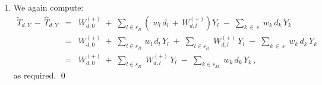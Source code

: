 \begin{enumerate}
\begin{eqnarray*}
            \underset{k \in s_{M}^{(j)}}{\sum}\;
            w_{k}\,d_{k}\,\varphi^{(j)}_{0k}
            \,\right)
        \,+\,
        \left(\;
            \underset{l \in s_{R}}{\sum}\;w_{l}\,d_{l}\,Y_{l}
            \,+\,
            \underset{l \in s_{R}}{\sum}\!\left(\;
                \overset{J}{\underset{j=1}{\sum}}\;
                \underset{k \in s_{M}^{(j)}}{\sum}\,w_{k}\,d_{k}\,\varphi^{(j)}_{lk}
                \right)
            Y_{l}
            \right)
    \\
    & = &
        \left(\;
            \overset{J}{\underset{j=1}{\sum}}\;
            \underset{k \in s_{M}^{(j)}}{\sum}\;
            w_{k}\,d_{k}\,\varphi^{(j)}_{0k}
            \,\right)
        \,+\,
        \underset{l \in s_{R}}{\sum}
        \left(\;
            w_{l}\,d_{l}
            \,+\,
            \left(\;
                \overset{J}{\underset{j=1}{\sum}}\;
                \underset{k \in s_{M}^{(j)}}{\sum}\,w_{k}\,d_{k}\,\varphi^{(j)}_{lk}
                \right)
            \right)
        Y_{l}
    \\
    & \overset{{\color{white}\textnormal{\LARGE$1$}}}{=} &
        W^{(+)}_{d,0}
        \;+\;
        \underset{l \in s_{R}}{\sum}\left(\,w_{l}d_{l} \,+\, W^{(+)}_{d,l}\,\right)Y_{l}
    \end{eqnarray*}
\item
    We again compute:
    \begin{eqnarray*}
    \widetilde{T}_{d,Y}
    \,-\,
    \widehat{T}_{d,Y}
    & = &
        W^{(+)}_{d,0}
        \;+\;
        \underset{l \in s_{R}}{\sum}\!
        \left(\;
            w_{l}\,d_{l}
            \,+\,
            W^{(+)}_{d,l}
            \right)
        Y_{l}
        \;-\;
        \underset{k\,\in\,s}{\sum}\;w_{k}\,d_{k}\,Y_{k}
    \\
    & = &
        W^{(+)}_{d,0}
        \;+\;
        \underset{l \in s_{R}}{\sum}\,w_{l}\,d_{l}\,Y_{l}
        \;+\;
        \underset{l \in s_{R}}{\sum}\;W^{(+)}_{d,l}\,Y_{l}
        \;-\;
        \underset{k\,\in\,s}{\sum}\;w_{k}\,d_{k}\,Y_{k}
    \\
    & = &
        W^{(+)}_{d,0}
        \;+\;
        \underset{l \in s_{R}}{\sum}\;W^{(+)}_{d,l}\,Y_{l}
        \;-\;
        \underset{k \in s_{M}}{\sum}\;w_{k}\,d_{k}\,Y_{k}\,,
    \end{eqnarray*}
    as required.
    \qed
\end{enumerate}


\clearpage
